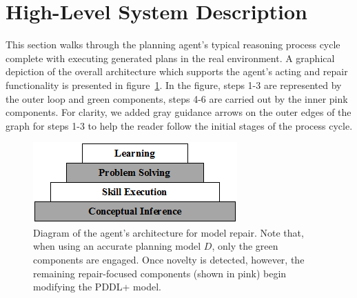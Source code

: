 \documentclass[letterpaper]{article} %
\begin{document}
\section{High-Level System Description}

This section walks through the planning agent's typical reasoning process cycle complete with executing generated plans in the real environment. A graphical depiction of the overall architecture which supports the agent's acting and repair functionality is presented in figure~\ref{fig:repair_architecture}. In the figure, steps 1-3 are represented by the outer loop and green components, steps 4-6 are carried out by the inner pink components. For clarity, we added gray guidance arrows on the outer edges of the graph for steps 1-3 to help the reader follow the initial stages of the process cycle.

\begin{figure}
	\centering
	\includegraphics[width=\columnwidth]{cascade.png}
	\caption{Diagram of the agent's architecture for model repair. Note that, when using an accurate planning model $D$, only the green components are engaged. Once novelty is detected, however, the remaining repair-focused components (shown in pink) begin modifying the PDDL+ model.}
	\label{fig:repair_architecture}
\end{figure}
\end{document}

